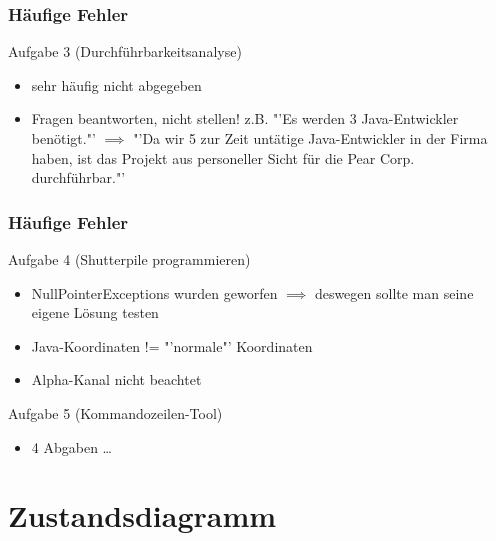 \documentclass[18pt]{beamer}
\begin{document}
	\begin{frame}
		\frametitle{Häufige Fehler}
		\begin{block}{Aufgabe 3 (Durchführbarkeitsanalyse)}
			\begin{itemize}
				\item sehr häufig nicht abgegeben
				\pause
				\item Fragen beantworten, nicht stellen!
				\linebreak z.B. "'Es werden 3 Java-Entwickler benötigt."' $\implies$
				"'Da wir 5 zur Zeit untätige Java-Entwickler in der Firma haben, ist das Projekt aus personeller Sicht für die Pear Corp. durchführbar."'
			\end{itemize}
		\end{block}
	\end{frame}

	\begin{frame}
		\frametitle{Häufige Fehler}
		\begin{block}{Aufgabe 4 (Shutterpile programmieren)}
			\begin{itemize}
				\item NullPointerExceptions wurden geworfen  \linebreak
				$\implies$ deswegen sollte man seine eigene Lösung testen
				\pause 
				\item Java-Koordinaten != "'normale"' Koordinaten
				\pause
				\item Alpha-Kanal nicht beachtet
			\end{itemize}
		\end{block}
	
	\begin{block}{Aufgabe 5 (Kommandozeilen-Tool)}
		\begin{itemize}
			\item 4 Abgaben \dots
		\end{itemize}
	\end{block}
\end{frame}

\section{Zustandsdiagramm}
\end{document}
